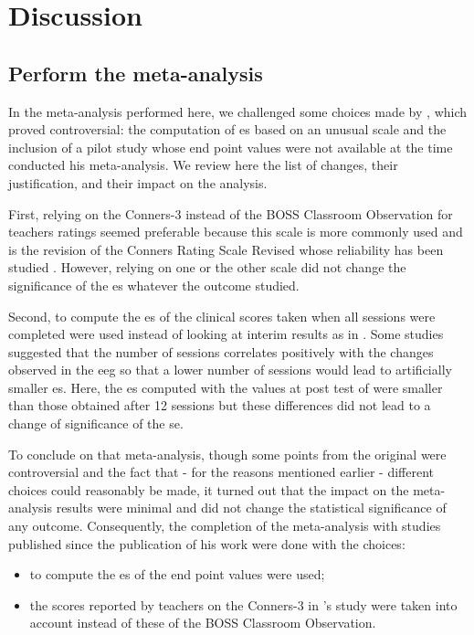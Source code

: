 


\section{Discussion}

\subsection{Perform the meta-analysis} 

In the meta-analysis performed here, we challenged some choices made by \citeauthor{Cortese2016}, which proved controversial: 
the computation of \gls{es} based on an unusual scale \citep{Steiner2014} and the inclusion of a pilot study \citep{Arnold2014} 
whose end point values were not available at the time \citeauthor{Cortese2016} conducted his meta-analysis. We review here the 
list of changes, their justification, and their impact on the analysis.
 
First, relying on the Conners-3 \citep{Conners2008} instead of the BOSS Classroom Observation \citep{Shapiro2010} for
teachers ratings seemed preferable because this scale is more commonly used \citep{Christiansen2014, Bluschke2016} and is
the revision of the Conners Rating Scale Revised \citep{Conners1998} whose reliability has been studied \citep{Collett2003}. 
However, relying on one or the other scale did not change the significance of the \gls{es} whatever the outcome studied.

Second, to compute the \gls{es} of \citet{Arnold2014} the clinical scores taken when all sessions were completed were 
used instead of looking at interim results as in \citeauthor{Cortese2016}. Some studies suggested that the number of sessions 
correlates positively with the changes observed in the \gls{eeg} \citep{Vernon2004} so that a lower number of sessions would 
lead to artificially smaller \gls{es}. Here, the \gls{es} computed with the values at post test of \citet{Arnold2014} were smaller 
than those obtained after 12 sessions but these differences did not lead to a change of significance of the \gls{se}. 

To conclude on that meta-analysis, though some points from the original were controversial and the fact that - for the
reasons mentioned earlier - different choices could reasonably be made, it turned out that the impact on the
meta-analysis results were minimal and did not change the statistical significance of any outcome. Consequently, the
completion of the meta-analysis with studies published since the publication of his work were done with the choices:
\begin{itemize} 
  \item to compute the \gls{es} of \citet{Arnold2014} the end point values were used; 
  \item the scores reported by teachers on the Conners-3 in \citeauthor{Steiner2014}'s study were taken into account 
	instead of these of the BOSS Classroom Observation.  
\end{itemize} 

